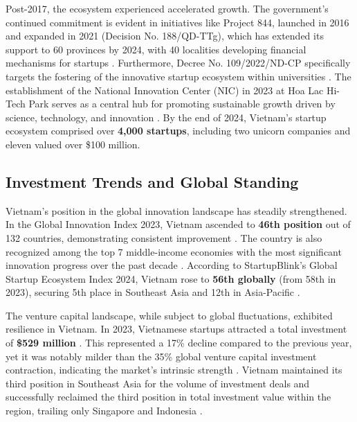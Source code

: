 \documentclass[../Main.tex]{subfiles}%
\begin{document}
	Post-2017, the ecosystem experienced accelerated growth. The government's continued commitment is evident in initiatives like Project 844, launched in 2016 and expanded in 2021 (Decision No. 188/QD-TTg), which has extended its support to 60 provinces by 2024, with 40 localities developing financial mechanisms for startups \autocite{nssc2024project}. Furthermore, Decree No. 109/2022/ND-CP specifically targets the fostering of the innovative startup ecosystem within universities \autocite{nssc2024project}. The establishment of the National Innovation Center (NIC) in 2023 at Hoa Lac Hi-Tech Park serves as a central hub for promoting sustainable growth driven by science, technology, and innovation \autocite{vietnam_innovation_report_2024}. By the end of 2024, Vietnam's startup ecosystem comprised over \textbf{4,000 startups}, including two unicorn companies and eleven valued over \$100 million.

	\subsection{Investment Trends and Global Standing}
	Vietnam's position in the global innovation landscape has steadily strengthened. In the Global Innovation Index 2023, Vietnam ascended to \textbf{46th position} out of 132 countries, demonstrating consistent improvement \autocite{vietnam_innovation_report_2024}. The country is also recognized among the top 7 middle-income economies with the most significant innovation progress over the past decade \autocite{vietnam_innovation_report_2024}. According to StartupBlink's Global Startup Ecosystem Index 2024, Vietnam rose to \textbf{56th globally} (from 58th in 2023), securing 5th place in Southeast Asia and 12th in Asia-Pacific \autocite{startupblink2024, vietnamnews2024pm}.

	The venture capital landscape, while subject to global fluctuations, exhibited resilience in Vietnam. In 2023, Vietnamese startups attracted a total investment of \textbf{\$529 million} \autocite{vietnam_innovation_report_2024}. This represented a 17\% decline compared to the previous year, yet it was notably milder than the 35\% global venture capital investment contraction, indicating the market's intrinsic strength \autocite{vietnam_innovation_report_2024}. Vietnam maintained its third position in Southeast Asia for the volume of investment deals and successfully reclaimed the third position in total investment value within the region, trailing only Singapore and Indonesia \autocite{vietnam_innovation_report_2024}.
\end{document}
